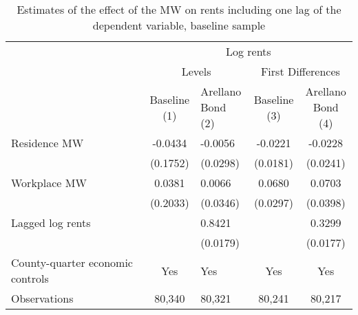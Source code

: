 \begin{table}[hbt!]
    \centering
    \caption{Estimates of the effect of the MW on rents including one lag of the 
             dependent variable, baseline sample}
    \label{tab:arellano_bond}

    \begin{tabular}{@{}lclcc@{}}
        \toprule
                                             & \multicolumn{4}{c}{Log rents}                                                       \\ \cmidrule(l){2-5} 
                                             & \multicolumn{2}{c}{Levels}               & \multicolumn{2}{c}{First Differences}    \\ \cmidrule(l){2-5} 
        \multicolumn{1}{c}{}                 & \shortstack{Baseline\\(1)} 
                                             & \shortstack{Arellano\\Bond (2)} 
                                             & \shortstack{Baseline\\(3)} 
                                             & \shortstack{Arellano\\Bond (4)}                                                     \\ \midrule
        Residence MW                         & -0.0434                  & -0.0056               & -0.0221                  & -0.0228               \\
                                             & (0.1752)                & (0.0298)             & (0.0181)                & (0.0241)             \\
        Workplace MW                         & 0.0381                  & 0.0066               & 0.0680                  & 0.0703               \\
                                             & (0.2033)                & (0.0346)             & (0.0297)                & (0.0398)             \\
        Lagged log rents                     &                      & 0.8421               &                      & 0.3299               \\
                                             &                      & (0.0179)             &                      & (0.0177)             \\ \midrule
        County-quarter economic controls     & Yes                  & Yes               & Yes                  & Yes               \\
        Observations                         & 80,340                 & 80,321              & 80,241                 & 80,217              \\ \bottomrule
    \end{tabular}


\end{table}

